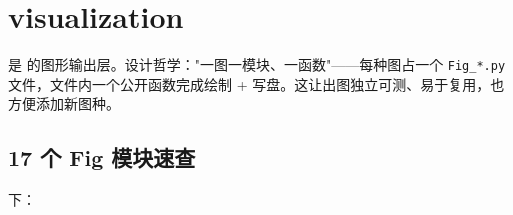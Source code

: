 
\chapter{visualization}

 是 \openbench{} 的图形输出层。设计哲学："一图一模块、一函数"——每种图占一个 \texttt{Fig\_*.py} 文件，文件内一个公开函数完成绘制 + 写盘。这让出图独立可测、易于复用，也方便添加新图种。

\section{17 个 Fig 模块速查}

 下：

